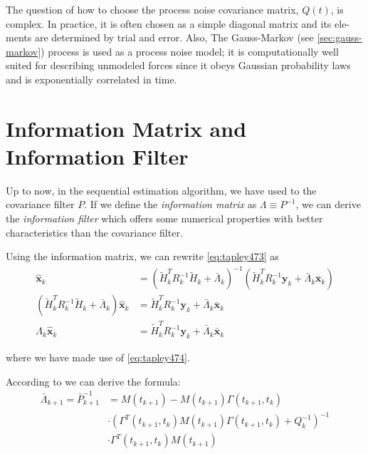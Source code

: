 The question of how to choose the process noise covariance matrix, \(Q(t)\), is
complex. In practice, it is often chosen as a simple diagonal matrix and its ele-
ments are determined by trial and error. Also, The Gauss-Markov (see \ref{sec:gauss-markov})
process is used as a 
process noise model; it is computationally well suited for describing unmodeled forces
since it obeys Gaussian probability laws and is exponentially correlated in time.

\section{Information Matrix and Information Filter}
\label{sec:information-matrix-and-information-filter}
Up to now, in the sequential estimation algorithm, we have used to the covariance filter 
\(P\). If we define the \emph{information matrix} as \(\Lambda \equiv P^{-1}\), we can 
derive the \emph{information filter} which offers some numerical properties with better 
characteristics than the covariance filter.

Using the information matrix, we can rewrite \ref{eq:tapley473} as
\begin{equation}
  \label{eq:tapley4101}
  \begin{aligned}
    \hat{\bm{x}} _k &= \left( \tilde{H}^T_k R^{-1}_k \tilde{H}_k 
      + \bar{\Lambda}_k \right)^{-1} \left( \tilde{H}^T_k R^{-1}_k \bm{y}_k + 
        \bar{\Lambda}_k \bar{\bm{x}}_k \right) \\
    \left( \tilde{H}^T_k R^{-1}_k \tilde{H}_k + \bar{\Lambda}_k \right) \hat{\bm{x}} _k &= 
      \tilde{H}^T_k R^{-1}_k \bm{y}_k + \bar{\Lambda}_k \bar{\bm{x}}_k \\
    \Lambda _k \hat{\bm{x}} _k &= 
      \tilde{H}^T_k R^{-1}_k \bm{y}_k + \bar{\Lambda}_k \bar{\bm{x}}_k
  \end{aligned}
\end{equation}

where we have made use of \ref{eq:tapley474}.

According to \cite{tapley} we can derive the formula:
\begin{equation}
  \label{eq:tapley4104}
  \begin{split}
    \bar{\Lambda}_{k+1} = \bar{P}^{-1}_{k+1} &= 
      M(t_{k+1}) - M(t_{k+1}) \Gamma (t_{k+1}, t_k ) \\
    & \cdot \left( \Gamma ^T (t_{k+1}, t_k ) M(t_{k+1}) \Gamma (t_{k+1}, t_k ) + Q^{-1}_k \right) ^{-1} \\
    & \cdot \Gamma ^T (t_{k+1}, t_k ) M(t_{k+1})
  \end{split}
\end{equation}

